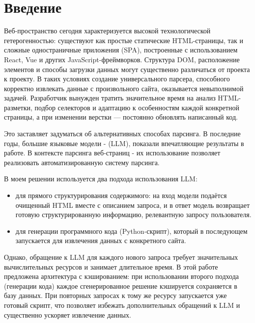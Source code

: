 
\section*{Введение}
\thispagestyle{withCompileDate}

Веб-пространство сегодня характеризуется высокой технологической гетерогенностью:
существуют как простые статические HTML-страницы, так и сложные одностраничные приложения (SPA),
построенные с использованием React, Vue и других JavaScript-фреймворков.
Структура DOM, расположение элементов и способы загрузки данных могут существенно различаться от проекта к проекту.
В таких условиях создание универсального парсера, способного корректно извлекать данные с произвольного сайта,
оказывается невыполнимой задачей. Разработчик вынужден тратить значительное время
на анализ HTML-разметки, подбор селекторов и адаптацию к особенностям каждой конкретной страницы,
а при изменении верстки — постоянно обновлять написанный код.

Это заставляет задуматься об альтернативных способах парсинга.
В последние годы, большие языковые модели - (LLM), показали впечатляющие результаты в работе.
В контексте парсинга веб‐страниц - их использование позволяет реализовать автоматизированную систему парсинга.

В моем решении используется два подхода использования LLM:
\begin{itemize}
	\item для прямого структурирования содержимого: на вход модели подаётся очищенный HTML вместе с описанием запроса, и в ответ модель возвращает готовую структурированную
информацию, релевантную запросу пользователя.
	\item для генерации программного кода (Python‐скрипт),
который в последующем запускается для извлечения данных с конкретного сайта.
\end{itemize}

Однако, обращение к LLM для каждого нового запроса
требует значительных вычислительных ресурсов и занимает длительное время.
В этой работе предложена архитектура с кэшированием: при использовании второго подхода (генерации кода)
каждое сгенерированное решение кэшируется сохраняется в базу данных. При повторных запросах к тому же ресурсу запускается
уже готовый скрипт, что позволяет избежать дополнительных обращений к LLM и существенно ускоряет извлечение данных.

